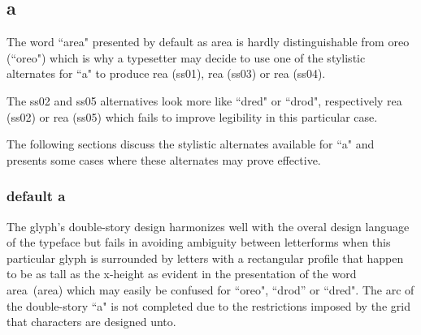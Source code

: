 \subsection{a}


The word ``area" presented by default as {\ssdefault area} is hardly
distinguishable from {\ssdefault oreo} (``oreo") which is why a typesetter may
decide to use one of the stylistic alternates for ``a" to produce
{re{\ssone a}} (ss01),
{re{\ssthree a}} (ss03) or
{re{\ssfour a}} (ss04).

The ss02 and ss05 alternatives look more like ``dred" or ``drod", respectively
{re{\sstwo a}} (ss02) or
{re{\ssfive a}} (ss05)
which fails to improve legibility in this particular case.

The following sections discuss the stylistic alternates available for ``a" and
presents some cases where these alternates may prove effective.

\subsubsection{default {\ssdefault a}}

The glyph's double-story design harmonizes well with the overal design
language of the typeface but fails in avoiding ambiguity between letterforms
when this particular glyph is surrounded by letters with a rectangular profile
that happen to be as tall as the x-height as evident in the presentation of the
word \mbox{{\ssdefault area} (area)} which may easily be confused for ``oreo",
``drod'' or ``dred". The arc of the double-story ``a" is not completed due to
the restrictions imposed by the grid that characters are designed unto.

